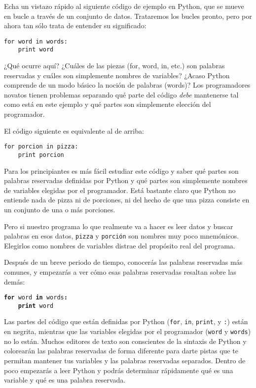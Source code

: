 Echa un vistazo rápido al siguiente código de ejemplo en Python, que se mueve en bucle a través de
un conjunto de datos. Trataremos los bucles pronto, pero por ahora tan sólo trata de entender
su significado:

\beforeverb
\begin{verbatim}
for word in words:
    print word
\end{verbatim}
\afterverb
%
¿Qué ocurre aquí? ¿Cuáles de las piezas (for, word, in, etc.) son palabras reservadas
y cuáles son simplemente nombres de variables? ¿Acaso Python comprende de un modo
básico la noción de palabras (words)? Los programadores novatos tienen
problemas separando qué parte del código
\emph{debe} mantenerse tal como está en este ejemplo y qué partes son simplemente
elección del programador.

El código siguiente es equivalente al de arriba:

\beforeverb
\begin{verbatim}
for porcion in pizza:
    print porcion
\end{verbatim}
\afterverb
%
Para los principiantes es más fácil estudiar este código y saber qué partes
son palabras reservadas definidas por Python y qué partes son simplemente nombres
de variables elegidas por el programador. Está bastante claro que Python no
entiende nada de pizza ni de porciones,
ni del hecho de que una pizza consiste en un conjunto de una o más porciones.

Pero si nuestro programa lo que realmente va a hacer es leer datos y buscar palabras en esos datos,
{\tt pizza} y {\tt porción} son nombres muy poco mnemónicos. Elegirlos como
nombres de variables distrae del propósito real del programa.

Después de un breve periodo de tiempo, conocerás las palabras reservadas más comunes,
y empezarás a ver cómo esas palabras reservadas resaltan sobre las demás:

{\tt {\bf for} word {\bf in} words{\bf :}\\
\verb"    "{\bf print} word }

Las partes del código que están definidas por
Python ({\tt for}, {\tt in}, {\tt print}, y {\tt :}) están en negrita,
mientras que las variables elegidas por el programador ({\tt word} y {\tt words}) no lo están.
Muchos editores de texto son conscientes de la sintaxis de Python
y colorearán las palabras reservadas de forma diferente para darte pistas que te permitan
mantener tus variables y las palabras reservadas separados.
Dentro de poco empezarás a leer Python y podrás determinar rápidamente qué
es una variable y qué es una palabra reservada.

